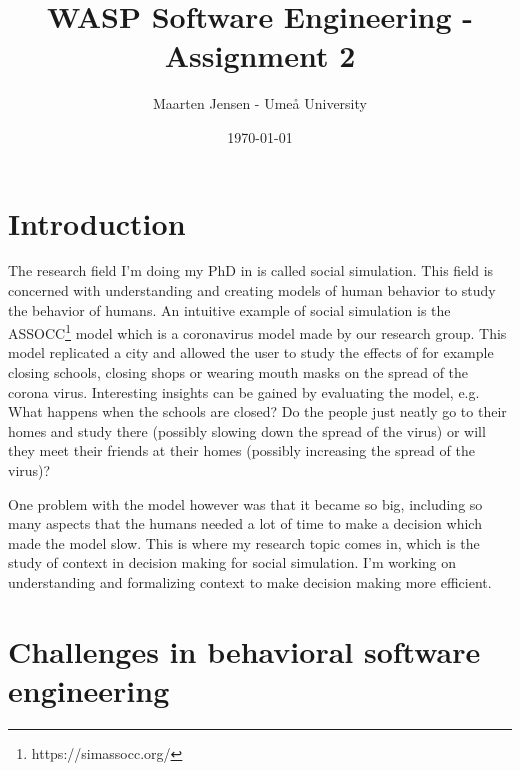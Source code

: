 \documentclass[11pt]{article}
\title{WASP Software Engineering - Assignment 2}
\date{\today}
\author{Maarten Jensen - Ume{\aa} University}
\begin{document}
	\maketitle
	
\section{Introduction}
The research field I'm doing my PhD in is called social simulation. This field is concerned with understanding and creating models of human behavior to study the behavior of humans. An intuitive example of social simulation is the ASSOCC\footnote{https://simassocc.org/} model which is a coronavirus model made by our research group. This model replicated a city and allowed the user to study the effects of for example closing schools, closing shops or wearing mouth masks on the spread of the corona virus. Interesting insights can be gained by evaluating the model, e.g. What happens when the schools are closed? Do the people just neatly go to their homes and study there (possibly slowing down the spread of the virus) or will they meet their friends at their homes (possibly increasing the spread of the virus)?

One problem with the model however was that it became so big, including so many aspects that the humans needed a lot of time to make a decision which made the model slow. This is where my research topic comes in, which is the study of context in decision making for social simulation. I'm working on understanding and formalizing context to make decision making more efficient. 


\section{Challenges in behavioral software engineering}

\end{document}
